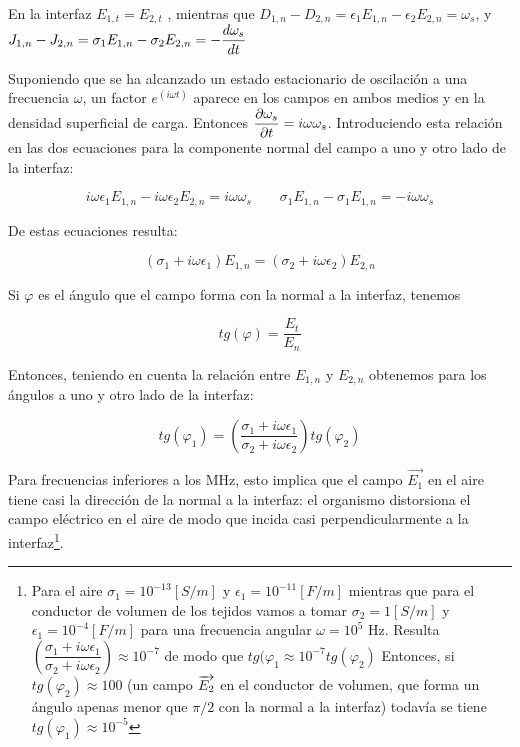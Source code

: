 En la interfaz $E_{1, t}=E_{2,t}$ , mientras que $D_{1,n}-D_{2,n}=\epsilon_{1}E_{1,n}-\epsilon_{2}E_{2,n}=\omega_{s}$, y $J_{1,n}-J_{2,n}=\sigma_{1}E_{1,n}-\sigma_{2}E_{2,n}=-\dfrac{d\omega_{s}}{dt}$

Suponiendo que se ha alcanzado un estado estacionario de oscilación a una frecuencia $\omega$, un factor $e^(i\omega t)$ aparece en los campos en ambos medios y en la densidad superficial de carga. Entonces $\dfrac{\partial \omega_{s}}{\partial t}=i\omega\omega_{s}$. Introduciendo esta relación en las dos ecuaciones para la componente normal del campo a uno y otro lado de la interfaz:


\begin{equation}
	i \omega \epsilon_{1} E_{1,n}-i \omega \epsilon_{2} E_{2,n}= i\omega\omega_{s}\quad \quad
	\sigma_{1}E_{1,n}-\sigma_{1}E_{1,n}=-i\omega\omega_{s}
\end{equation}


De estas ecuaciones resulta:

\begin{equation}
	(\sigma_{1} + i \omega \epsilon_{1}) E_{1,n} = (\sigma_{2}+i \omega \epsilon_{2}) E_{2,n}
\end{equation}

Si $\varphi$ es el ángulo que el campo forma con la normal a la interfaz, tenemos 

\begin{equation*}
tg(\varphi)= \dfrac{E_{t}}{E_{n}} 
\end{equation*}


Entonces, teniendo en cuenta la relación entre $E_{1,n}$ y $E_{2,n}$ obtenemos para los ángulos a uno y otro lado de la interfaz:

\begin{equation}
	tg(\varphi_{1})= \left( \dfrac{\sigma_{1} + i \omega \epsilon_{1}}{\sigma_{2}+i \omega \epsilon_{2}}\right) tg(\varphi_{2})
\end{equation}

Para frecuencias inferiores a los MHz, esto implica que el campo $\overrightarrow{E_{1}}$ en el aire tiene casi la dirección de la normal a la interfaz: el organismo distorsiona el campo eléctrico en el aire de modo que incida casi perpendicularmente a la interfaz\footnote{
Para el aire $\sigma_{1}=10^{−13}[S/m]$ y $\epsilon_{1}= 10^{-11} [F/m]$ mientras que para el conductor de volumen de los tejidos vamos a tomar $\sigma_{2}=1[S/m]$ y $\epsilon_{1}= 10^{-4} [F/m]$ para una frecuencia angular $\omega=10^{5}$ Hz. Resulta  $\left( \dfrac{\sigma_{1} + i \omega \epsilon_{1}}{\sigma_{2}+i \omega \epsilon_{2}}\right) \approx 10^{-7}$ de modo que $tg(\varphi_{1} \approx 10^{-7} tg(\varphi_{2})	$ Entonces, si $tg(\varphi_{2}) \approx 100$ (un campo $\overrightarrow{E_{2}}$ en el conductor de volumen, que forma un ángulo apenas menor que $\pi/2$ con la normal a la interfaz) todavía se tiene $tg(\varphi_{1})\approx 10^{-5}$}.

